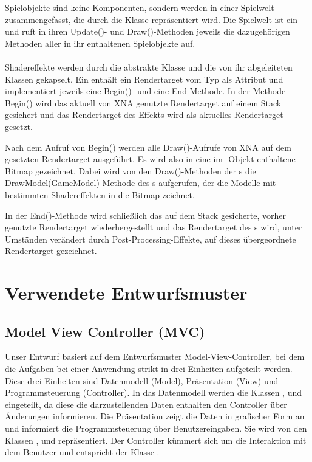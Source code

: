 Spielobjekte sind keine Komponenten, sondern werden in einer Spielwelt zusammengefasst, die durch die Klasse  repräsentiert wird. Die Spielwelt ist ein  und ruft in ihren Update()- und Draw()-Methoden jeweils die dazugehörigen Methoden aller in ihr enthaltenen Spielobjekte auf.
\\\\
Shadereffekte werden durch die abstrakte Klasse  und die von ihr abgeleiteten Klassen gekapselt. Ein  enthält ein Rendertarget vom Typ  als Attribut und implementiert jeweils eine Begin()- und eine End-Methode. In der Methode Begin() wird das aktuell von XNA genutzte Rendertarget auf einem Stack gesichert und das Rendertarget des Effekts wird als aktuelles Rendertarget gesetzt.

Nach dem Aufruf von Begin() werden alle Draw()-Aufrufe von XNA auf dem gesetzten Rendertarget ausgeführt. Es wird also in eine im -Objekt enthaltene Bitmap gezeichnet. Dabei wird von den Draw()-Methoden der s die DrawModel(GameModel)-Methode des s aufgerufen, der die Modelle mit bestimmten Shadereffekten in die Bitmap zeichnet.

In der End()-Methode wird schließlich das auf dem Stack gesicherte, vorher genutzte Rendertarget wiederhergestellt und das Rendertarget des s wird, unter Umständen verändert durch Post-Processing-Effekte, auf dieses übergeordnete Rendertarget gezeichnet.


\section{Verwendete Entwurfsmuster}

\subsection{Model View Controller (MVC)}
Unser Entwurf basiert auf dem Entwurfsmuster Model-View-Controller, bei dem die Aufgaben bei einer Anwendung strikt in drei Einheiten aufgeteilt werden. Diese drei Einheiten sind  Datenmodell (Model), Präsentation (View) und Programmsteuerung (Controller).
\newline
\newline
In das Datenmodell werden die Klassen ,  und  eingeteilt, da diese die darzustellenden Daten enthalten den Controller über Änderungen informieren. Die Präsentation zeigt die Daten in grafischer Form an und informiert die Programmsteuerung über Benutzereingaben. Sie wird von den Klassen ,  und  repräsentiert.
Der Controller kümmert sich um die Interaktion mit dem Benutzer und entspricht der Klasse .

